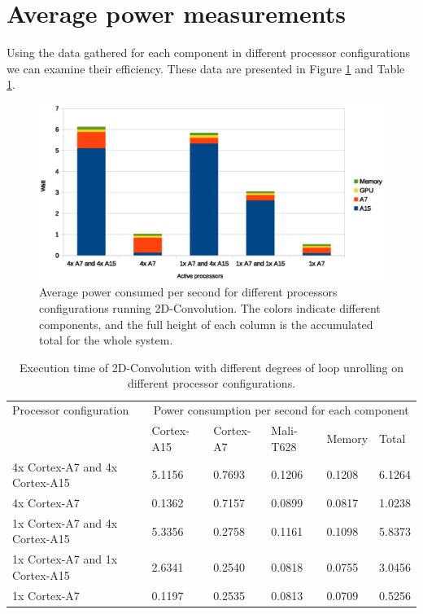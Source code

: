 \section{Average power measurements}
Using the data gathered for each component in different processor configurations we can examine their efficiency.
These data are presented in Figure \ref{power-configurations} and Table \ref{power-configurations-table}.
\begin{figure}[H]
  \centering
  \includegraphics[width=160mm]{fig/power-configurations.eps}
  \caption{Average power consumed per second for different processors configurations running 2D-Convolution. The colors indicate different components, and the full height of each column is the accumulated total for the whole system.\label{overflow}} \label{power-configurations}
\end{figure}

\begin{table}[H]
  \begin{tabular}{llllll}
    \toprule
    Processor configuration         & \multicolumn{5}{c}{Power consumption per second for each component} \\
                                    & Cortex-A15  & Cortex-A7 & Mali-T628 & Memory  & Total \\
    \midrule
    4x Cortex-A7 and 4x Cortex-A15  & 5.1156          & 0.7693        & 0.1206        & 0.1208  & 6.1264 \\
    4x Cortex-A7                    & 0.1362          & 0.7157        & 0.0899        & 0.0817  & 1.0238 \\
    1x Cortex-A7 and 4x Cortex-A15  & 5.3356          & 0.2758        & 0.1161        & 0.1098  & 5.8373 \\
    1x Cortex-A7 and 1x Cortex-A15  & 2.6341          & 0.2540        & 0.0818        & 0.0755  & 3.0456 \\
    1x Cortex-A7                    & 0.1197          & 0.2535        & 0.0813        & 0.0709  & 0.5256 \\
    \bottomrule
  \end{tabular}
  \caption{Execution time of 2D-Convolution with different degrees of loop unrolling on different processor configurations. \label{power-configurations-table}}
\end{table}

